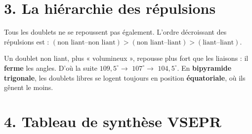 \documentclass[11pt,a4paper]{article}
\begin{document}
\section*{3. La hiérarchie des répulsions}

Tous les doublets ne se repoussent pas également. L'ordre décroissant des répulsions est :
$(\text{non liant}\text{--}\text{non liant}) > (\text{non liant}\text{--}\text{liant}) >
(\text{liant}\text{--}\text{liant})$.

\begin{attnbox}
Un doublet non liant, plus « volumineux », repousse plus fort que les liaisons : il \textbf{ferme}
les angles. D'où la suite  $109{,}5^\circ \to$  $107^\circ \to$ 
$104{,}5^\circ$. En \textbf{bipyramide trigonale}, les doublets libres se logent toujours en
position \textbf{équatoriale}, où ils gênent le moins.
\end{attnbox}

\section*{4. Tableau de synthèse VSEPR}
\end{document}
